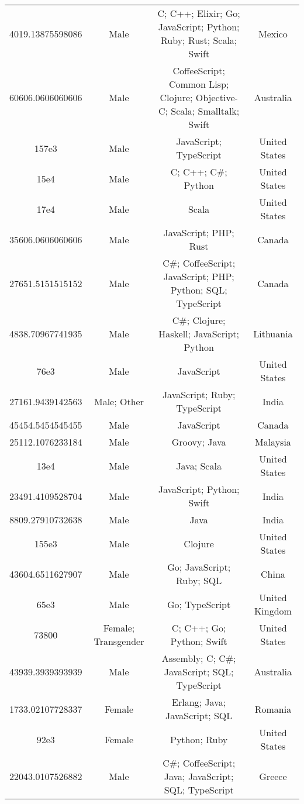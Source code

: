 \begin{center}
\begin{tabular}{ |c|c|c|c| }
4019.13875598086  &  Male  &  C; C++; Elixir; Go; JavaScript; Python; Ruby; Rust; Scala; Swift  &  Mexico  \\ 
60606.0606060606  &  Male  &  CoffeeScript; Common Lisp; Clojure; Objective-C; Scala; Smalltalk; Swift  &  Australia  \\ 
157e3  &  Male  &  JavaScript; TypeScript  &  United States  \\ 
15e4  &  Male  &  C; C++; C\#; Python  &  United States  \\ 
17e4  &  Male  &  Scala  &  United States  \\ 
35606.0606060606  &  Male  &  JavaScript; PHP; Rust  &  Canada  \\ 
27651.5151515152  &  Male  &  C\#; CoffeeScript; JavaScript; PHP; Python; SQL; TypeScript  &  Canada  \\ 
4838.70967741935  &  Male  &  C\#; Clojure; Haskell; JavaScript; Python  &  Lithuania  \\ 
76e3  &  Male  &  JavaScript  &  United States  \\ 
27161.9439142563  &  Male; Other  &  JavaScript; Ruby; TypeScript  &  India  \\ 
45454.5454545455  &  Male  &  JavaScript  &  Canada  \\ 
25112.1076233184  &  Male  &  Groovy; Java  &  Malaysia  \\ 
13e4  &  Male  &  Java; Scala  &  United States  \\ 
23491.4109528704  &  Male  &  JavaScript; Python; Swift  &  India  \\ 
8809.27910732638  &  Male  &  Java  &  India  \\ 
155e3  &  Male  &  Clojure  &  United States  \\ 
43604.6511627907  &  Male  &  Go; JavaScript; Ruby; SQL  &  China  \\ 
65e3  &  Male  &  Go; TypeScript  &  United Kingdom  \\ 
73800  &  Female; Transgender  &  C; C++; Go; Python; Swift  &  United States  \\ 
43939.3939393939  &  Male  &  Assembly; C; C\#; JavaScript; SQL; TypeScript  &  Australia  \\ 
1733.02107728337  &  Female  &  Erlang; Java; JavaScript; SQL  &  Romania  \\ 
92e3  &  Female  &  Python; Ruby  &  United States  \\ 
22043.0107526882  &  Male  &  C\#; CoffeeScript; Java; JavaScript; SQL; TypeScript  &  Greece  \\ 

\end{tabular}
\end{center}
